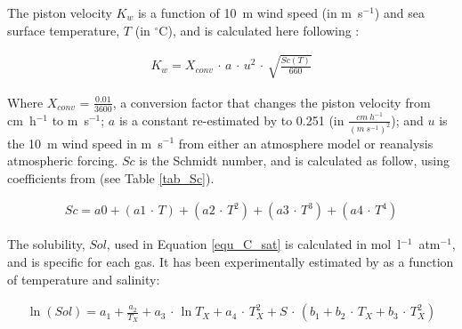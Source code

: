 \documentclass[../main/TOP_manual]{subfiles}
\begin{document}
The piston velocity $K_{w}$ is a function of 10~m wind speed (in m~s$^{-1}$) and sea surface temperature,
$T$ (in $^{\circ}$C), and is calculated here following \citet{wanninkhof_1992}:

\begin{eqnarray}
K_{w} = X_{conv} \, \cdot \, a \, \cdot \, u^2 \, \cdot \, \sqrt{ \frac{Sc(T)}{660} }
\label{equ_Kw}
\end{eqnarray}

Where $X_{conv}$ = $\frac{0.01}{3600}$, a conversion factor that changes the piston velocity
from cm~h$^{-1}$ to m~s$^{-1}$;
$a$ is a constant re-estimated by \citet{wanninkhof_2014} to 0.251 (in $\frac{cm~h^{-1}}{(m~s^{-1})^{2}}$);
and $u$ is the 10~m wind speed in m~s$^{-1}$ from either an atmosphere model or reanalysis atmospheric forcing.
$Sc$ is the Schmidt number, and is calculated as follow, using coefficients from \citet{wanninkhof_2014} (see Table \autoref{tab_Sc}).

\begin{eqnarray}
Sc =  a0 + (a1 \, \cdot \, T) + (a2  \, \cdot \, T^2) + (a3 \, \cdot \, T^3) + (a4 \, \cdot \, T^4)
\label{equ_Sc}
\end{eqnarray}

The solubility, $Sol$, used in Equation \autoref{equ_C_sat} is calculated in mol~l$^{-1}$~atm$^{-1}$,
and is specific for each gas.
It has been experimentally estimated by \citet{warner_1985} as a function of temperature and salinity:


\begin{eqnarray}
\ln{(Sol)} = a_1 + \frac{a_2}{ T_{X}} + a_3 \, \cdot \, \ln{ T_{X} } + a_4 \, \cdot \, T_{X}^2 + S \, \cdot \, ( b_1 + b_2 \, \cdot \, T_{X} + b_3 \, \cdot \, T_{X}^2 )
\label{equ_Sol_CFC}
\end{eqnarray}

\end{document}
